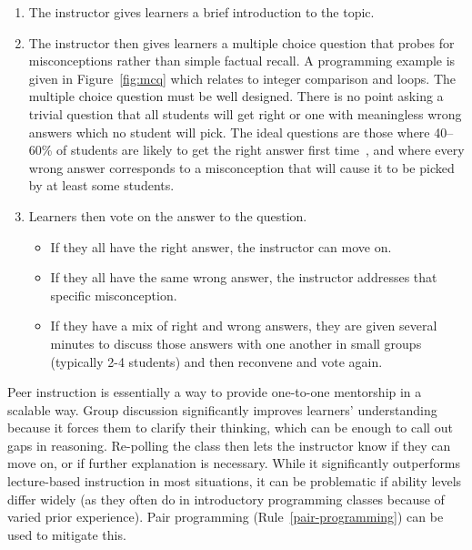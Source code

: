 \documentclass[10pt,letterpaper]{article}
\newcommand{\ruleref}[1]{Rule~\ref{#1}}
\begin{document}
\begin{enumerate}

\item The instructor gives learners a brief introduction to the topic.

\item The instructor then gives learners a multiple choice question
  that probes for misconceptions rather than simple factual recall.
  A programming example is given in Figure~\ref{fig:mcq}
  which relates to integer comparison and loops.  The multiple choice question must be well designed.
  There is no point asking a trivial question that all students will get right or one with meaningless wrong answers which no student will pick.
  The ideal questions are those where 40--60\% of students are likely to get the right answer first time~\cite[p23]{nrc-reaching}, and where every wrong answer corresponds to a misconception that will cause it to be picked by at least some students.

\item Learners then vote on the answer to the question.

  \begin{itemize}
  \item If they all have the right answer, the instructor can move on.
  \item If they all have the same wrong answer,
    the instructor addresses that specific misconception.
  \item If they have a mix of right and wrong answers,
    they are given several minutes to discuss those answers with one another
    in small groups (typically 2-4 students)
    and then reconvene and vote again.
  \end{itemize}

\end{enumerate}

Peer instruction is essentially
a way to provide one-to-one mentorship in a scalable way.
Group discussion significantly improves learners' understanding
because it forces them to clarify their thinking,
which can be enough to call out gaps in reasoning.
Re-polling the class then lets the instructor know if they can move on,
or if further explanation is necessary.
While it significantly outperforms lecture-based instruction in most situations,
it can be problematic if ability levels differ widely
(as they often do in introductory programming classes
because of varied prior experience).
Pair programming (\ruleref{pair-programming}) can be used to mitigate this.
\end{document}
